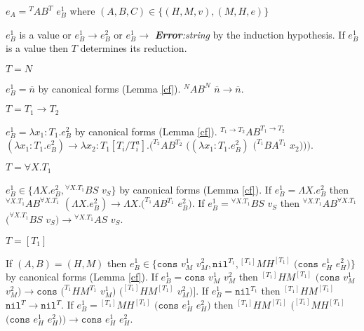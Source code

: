 \begin{case}
\label{ab}
$e_{A}={^{T}A}B^{T}$ $e_{B}^{1}$ where $(A,B,C)\in\lbrace(H,M,v),(M,H,e)\rbrace$

$e_{B}^{1}$ is a value or $e_{B}^{1}\rightarrow e_{B}^{2}$ or $e_{B}^{1}\rightarrow$ \emph{\textbf{Error}:\;string} by the induction hypothesis.  If $e_{B}^{1}$ is a value then $T$ determines its reduction.
\begin{subcase}
$T=N$

$e_{B}^{1}=\overline{n}$ by canonical forms (Lemma \ref{cf}).  $^{N}AB^{N}$ $\overline{n}\rightarrow\overline{n}$.
\end{subcase}
\begin{subcase}
$T=T_{1}\rightarrow T_{2}$

$e_{B}^{1}=\lambda x_{1}:T_{1}.e_{B}^{2}$ by canonical forms (Lemma \ref{cf}).  $^{T_{1}\rightarrow T_{2}}AB^{T_{1}\rightarrow T_{2}}$ $(\lambda x_{1}:T_{1}.e_{B}^{2})\rightarrow\lambda x_{2}:T_{1}[T_{i}/T^{a}_{i}].(^{T_{2}}AB^{T_{2}}$ $((\lambda x_{1}:T_{1}.e_{B}^{2})$ $(^{T_{1}}BA^{T_{1}}$ $x_{2})))$.
\end{subcase}
\begin{subcase}
$T=\forall X.T_{1}$

$e_{B}^{1}\in\lbrace\Lambda X.e_{B}^{2},{^{\forall X.T_{1}}B}S$ $v_{S}\rbrace$ by canonical forms (Lemma \ref{cf}).  If $e_{B}^{1}=\Lambda X.e_{B}^{2}$ then $^{\forall X.T_{1}}AB^{\forall X.T_{1}}$ $(\Lambda X.e_{B}^{2})\rightarrow\Lambda X.(^{T_{1}}AB^{T_{1}}$ $e_{B}^{2})$.  If $e_{B}^{1}={^{\forall X.T_{1}}B}S$ $v_{S}$ then $^{\forall X.T_{1}}AB^{\forall X.T_{1}}$ $(^{\forall X.T_{1}}BS$ $v_{S})\rightarrow{^{\forall X.T_{1}}A}S$ $v_{S}$.
\end{subcase}
\begin{subcase}
$T=[T_{1}]$

If $(A,B)=(H,M)$ then $e_{B}^{1}\in\lbrace\mathtt{cons}$ $v_{M}^{1}$ $v_{M}^{2},\mathtt{nil}^{T_{1}},{^{[T_{1}]}M}H^{[T_{1}]}$ $(\mathtt{cons}$ $e_{H}^{1}$ $e_{H}^{2})\rbrace$ by canonical forms (Lemma \ref{cf}).  If $e_{B}^{1}=\mathtt{cons}$ $v_{M}^{1}$ $v_{M}^{2}$ then $^{[T_{1}]}HM^{[T_{1}]}$ $(\mathtt{cons}$ $v_{M}^{1}$ $v_{M}^{2})\rightarrow\mathtt{cons}$ $(^{T_{1}}HM^{T_{1}}$ $v_{M}^{1})$ $(^{[T_{1}]}HM^{[T_{1}]}$ $v_{M}^{2})]$.  If $e_{B}^{1}=\mathtt{nil}^{T_{1}}$ then $^{[T_{1}]}HM^{[T_{1}]}$ $\mathtt{nil}^{T}\rightarrow\mathtt{nil}^{T}$.  If $e_{B}^{1}={^{[T_{1}]}M}H^{[T_{1}]}$ $(\mathtt{cons}$ $e_{H}^{1}$ $e_{H}^{2})$ then $^{[T_{1}]}HM^{[T_{1}]}$ $(^{[T_{1}]}MH^{[T_{1}]}$ $(\mathtt{cons}$ $e_{H}^{1}$ $e_{H}^{2}))\rightarrow\mathtt{cons}$ $e_{H}^{1}$ $e_{H}^{2}$.


\end{subcase}
\end{case}

